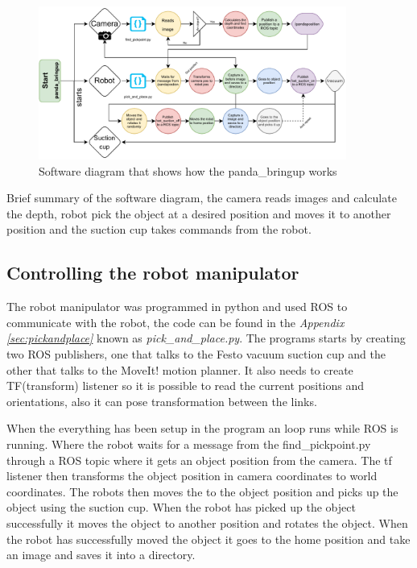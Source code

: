 \begin{figure}[h]
    \centering
    \includegraphics[width=0.9\textwidth]{graphics/softwareDiagram.pdf}
    \caption{Software diagram that shows how the panda\_bringup works}
    \label{fig:softwarediagram}
\end{figure}

Brief summary of the software diagram, the camera reads images and calculate the depth, robot pick the object at a desired position and moves it to another position and the suction cup takes commands from the robot.

\subsection{Controlling the robot manipulator}\label{robotcontrol}
The robot manipulator was programmed in python and used ROS to communicate with the robot, the code can be found in the \textit{Appendix \ref{sec:pickandplace}} known as \textit{pick\_and\_place.py}. 
The programs starts by creating two ROS publishers, one that talks to the Festo vacuum suction cup and the other that talks to the MoveIt! motion planner. 
It also needs to create TF(transform) listener so it is possible to read the current positions and orientations, also it can pose transformation between the links. 

When the everything has been setup in the program an loop runs while ROS is running. 
Where the robot waits for a message from the find\_pickpoint.py through a ROS topic where it gets an object position from the camera.
The tf listener then transforms the object position in camera coordinates to world coordinates. The robots then moves the to the object position and picks up the object using the suction cup. When the robot has picked up the object successfully it moves the object to another position and rotates the object. When the robot has successfully moved the object it goes to the home position and take an image and saves it into a directory. 

